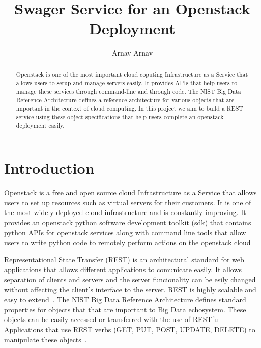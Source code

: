 
\title{Swager Service for an Openstack Deployment}


\author{Arnav Arnav}


\renewcommand{\shortauthors}{Arnav}


\begin{abstract}
Openstack is one of the most important cloud coputing Infrastructure
as a Service that allows users to setup and manage servers easily. It
provides APIs that help users to manage these services through
command-line and through code. The NIST Big Data Reference
Architecture defines a reference architecture for various objects that
are important in the context of cloud computing. In this project we
aim to build a REST service using these object specifications that
help users complete an openstack deployment easily.
\end{abstract}



\maketitle

\section{Introduction}
Openstack is a free and open source cloud Infrastructure as a Service
that allows users to set up resources such as virtual servers for
their customers. It is one of the most widely deployed cloud
infrastructure and is constantly improving. It provides an openstack
python software development toolkit (sdk) that contains python APIs
for openstack services along with command line tools that allow users
to write python code to remotely perform actions on the openstack
cloud

Representational State Transfer (REST) is an architectural standard
for web applications that allows different applications to comunicate
easily. It allows separation of clients and servers and the server
funcionality can be esily changed without affecting the client's
interface to the server. REST is highly scalable and easy to
extend~\cite{hid-sp18-503-REST}. The NIST Big Data Reference
Architecture defines standard properties for objects that that are
important to Big Data echosystem.
These objects can be easily accessed or transferred with the use of
RESTful Applications that use REST verbs (GET, PUT, POST, UPDATE,
DELETE) to manipulate these objects~\cite{hid-sp18-503-REST}.

